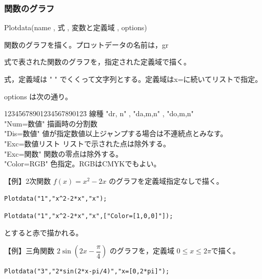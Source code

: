 \documentclass[papersize,a4paper,12pt,uplatex]{jsarticle}
\begin{document}
\subsubsection{関数のグラフ}
\begin{description}

\vspace{\baselineskip}
\hypertarget{plotdata}{}
\item[関数]  Plotdata(name , 式 , 変数と定義域 , options)
\item[機能]  関数のグラフを描く。プロットデータの名前は，gr
\item[説明]  式で表された関数のグラフを，指定された定義域で描く。

式，定義域は " " でくくって文字列とする。定義域はx=に続いてリストで指定。

options は次の通り。
\begin{tabbing}
12345678901234567890123\=\kill
    線種      \>"dr, n"  , "da,m,n" , "do,m,n"\\
    "Num=数値"      \>描画時の分割数\\
    "Dis=数値"       \>値が指定数値以上ジャンプする場合は不連続点とみなす。\\
    "Exc=数値リスト \>リストで示された点は除外する。\\
    "Exc=関数"      \>関数の零点は除外する。\\
    "Color=RGB"    \>色指定。RGBはCMYKでもよい。
\end{tabbing}

  【例】2次関数 $f(x)=x^2-2x$ のグラフを定義域指定なしで描く。
  
\hspace{10mm}  \verb|Plotdata("1","x^2-2*x","x");|

\vspace{\baselineskip}
\hspace{20mm} \scalebox{0.9}{}

 \verb|Plotdata("1","x^2-2*x","x",["Color=[1,0,0]"]);|

とすると赤で描かれる。

\vspace{\baselineskip}
  【例】三角関数 $2\sin \left(2x-\dfrac{\pi}{4} \right)$   のグラフを，定義域 $0 \leq x \leq 2 \pi$で描く。
  
\hspace{10mm} \verb|Plotdata("3","2*sin(2*x-pi/4)","x=[0,2*pi]");|

\vspace{\baselineskip}
\hspace{20mm}   


\end{description}
\end{document}

